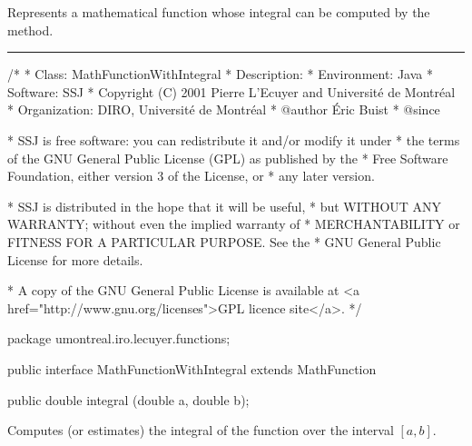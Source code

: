 
Represents a mathematical function whose
integral can be computed by the
 method.

\bigskip\hrule

\begin{code}
\begin{hide}
/*
 * Class:        MathFunctionWithIntegral
 * Description:  
 * Environment:  Java
 * Software:     SSJ 
 * Copyright (C) 2001  Pierre L'Ecuyer and Université de Montréal
 * Organization: DIRO, Université de Montréal
 * @author       Éric Buist
 * @since

 * SSJ is free software: you can redistribute it and/or modify it under
 * the terms of the GNU General Public License (GPL) as published by the
 * Free Software Foundation, either version 3 of the License, or
 * any later version.

 * SSJ is distributed in the hope that it will be useful,
 * but WITHOUT ANY WARRANTY; without even the implied warranty of
 * MERCHANTABILITY or FITNESS FOR A PARTICULAR PURPOSE.  See the
 * GNU General Public License for more details.

 * A copy of the GNU General Public License is available at
   <a href="http://www.gnu.org/licenses">GPL licence site</a>.
 */
\end{hide}
package umontreal.iro.lecuyer.functions;\begin{hide}

\end{hide}

public interface MathFunctionWithIntegral extends MathFunction\begin{hide} {
\end{hide}

   public double integral (double a, double b);\begin{hide}
}\end{hide}
\end{code}
\begin{tabb}   
   Computes (or estimates) the integral of the 
   function over the interval $[a, b]$.
\end{tabb}
\begin{htmlonly}
\end{htmlonly}
